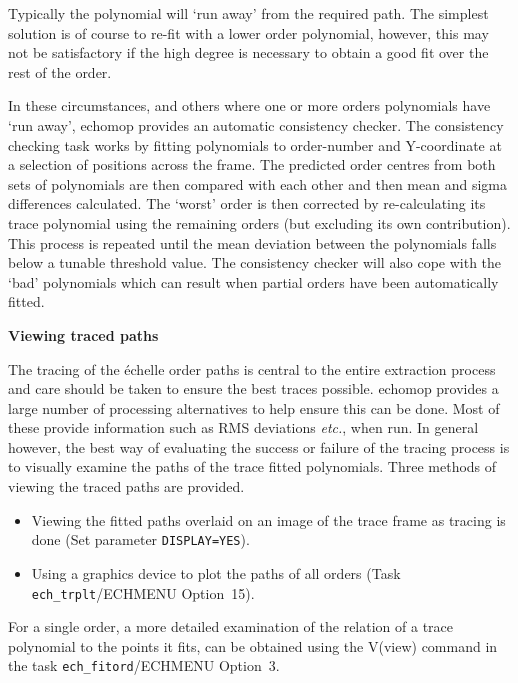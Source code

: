 \documentclass[11pt,twoside]{article}
\makeatletter
\newcommand{\htmlref}[2]{#1}
\newcommand{\myindex}[1]{\index{#1}}
\newcommand{\indexcmdname}[1]{\index{#1@\protect\cmdname{#1}}}
\renewcommand{\myindex}[1]{}
\renewcommand{\indexcmdname}[1]{}
\newcommand{\cmdname}{\begingroup \catcode`\_=12 \realcmdname}
\newcommand{\realcmdname}[1]{\endgroup\texttt{#1}}
\makeatother
\begin{document}
Typically the polynomial will `run away' from the required path. The
simplest solution is of course to re-fit with a lower order polynomial,
however, this may not be satisfactory if the high degree is necessary to
obtain a good fit over the rest of the order.

In these circumstances, and others where one or more orders polynomials
have `run away', {\sc echomop} provides an automatic consistency checker. The
consistency checking task works by fitting polynomials to order-number and
Y-coordinate at a selection of positions across the frame.
\myindex{Trace!consistency} The predicted order centres from both sets of
polynomials are then compared with each other and then mean and sigma
differences calculated. The `worst' order is then corrected by
re-calculating its trace polynomial using the remaining orders (but
excluding its own contribution). This process is repeated until the mean
deviation between the polynomials falls below a tunable threshold
value. The consistency checker will also cope with the `bad' polynomials
which can result when partial orders have been automatically fitted.

\newpage
{\large\bf Viewing traced paths}

The tracing of the \'{e}chelle order paths is central to the entire
extraction process and care should be taken to ensure the best traces
possible. {\sc echomop} provides a large number of processing alternatives to
help ensure this can be done. Most of these provide information such as
RMS deviations {\it etc.}, when run. In general however, the best way of
evaluating the success or failure of the tracing process is to visually
examine the paths of the trace fitted polynomials. Three methods of
viewing the traced paths are provided. \myindex{Order!viewing traces}

\begin{itemize}

\item Viewing the fitted paths overlaid on an image of the trace frame
      as tracing is done (Set parameter \texttt{DISPLAY=YES}).

\item Using a graphics device to plot the paths of all orders
      (Task \htmlref{{\tt ech\_trplt}/ECHMENU Option~15}{ech_trplt}).
      \indexcmdname{ECH_TRPLT}

\end{itemize}

For a single order, a more detailed examination of the relation of a
trace polynomial to the points it fits, can be obtained using the
V(view) command in the task \htmlref{{\tt ech\_fitord}/ECHMENU
Option~3}{ech_fitord}.
\end{document}
